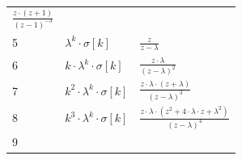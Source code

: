 \documentclass[11pt]{article}
\begin{document}
\begin{longtable}[]{@{}lll@{}}
\begin{minipage}[t]{0.58\columnwidth}
\(\frac{z\cdot(z+1)}{(z-1)^{-3}}\)\strut
\end{minipage}\tabularnewline
\begin{minipage}[t]{0.05\columnwidth}\raggedright\strut
5\strut
\end{minipage} & \begin{minipage}[t]{0.28\columnwidth}\raggedright\strut
\(\lambda^k \cdot \sigma[k]\)\strut
\end{minipage} & \begin{minipage}[t]{0.58\columnwidth}\raggedright\strut
\(\frac{z}{z-\lambda}\)\strut
\end{minipage}\tabularnewline
\begin{minipage}[t]{0.05\columnwidth}\raggedright\strut
6\strut
\end{minipage} & \begin{minipage}[t]{0.28\columnwidth}\raggedright\strut
\(k\cdot\lambda^k\cdot\sigma[k]\)\strut
\end{minipage} & \begin{minipage}[t]{0.58\columnwidth}\raggedright\strut
\(\frac{z\cdot\lambda}{(z-\lambda)^2}\)\strut
\end{minipage}\tabularnewline
\begin{minipage}[t]{0.05\columnwidth}\raggedright\strut
7\strut
\end{minipage} & \begin{minipage}[t]{0.28\columnwidth}\raggedright\strut
\(k^2\cdot\lambda^k\cdot\sigma[k]\)\strut
\end{minipage} & \begin{minipage}[t]{0.58\columnwidth}\raggedright\strut
\(\frac{z\cdot\lambda\cdot(z+\lambda)}{(z-\lambda)^3}\)\strut
\end{minipage}\tabularnewline
\begin{minipage}[t]{0.05\columnwidth}\raggedright\strut
8\strut
\end{minipage} & \begin{minipage}[t]{0.28\columnwidth}\raggedright\strut
\(k^3\cdot\lambda^k\cdot\sigma[k]\)\strut
\end{minipage} & \begin{minipage}[t]{0.58\columnwidth}\raggedright\strut
\(\frac{z\cdot\lambda\cdot(z^2+4\cdot\lambda\cdot z+ \lambda^2)}{(z-\lambda)^4}\)\strut
\end{minipage}\tabularnewline
\begin{minipage}[t]{0.05\columnwidth}\raggedright\strut
9\strut
\end{minipage} & \begin{minipage}[t]{0.28\columnwidth}\raggedright\strut

\end{minipage}
\end{longtable}
\end{document}
